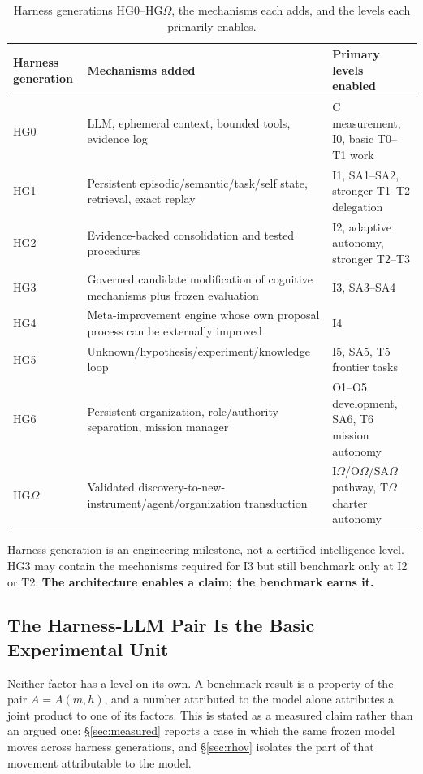 \documentclass[11pt]{article}
\theoremstyle{definition}
\newcommand{\Om}{\ensuremath{\Omega}}
\begin{document}
\begin{table}[H]
\centering\small
\begin{tabularx}{\textwidth}{@{}lYY@{}}
\toprule
Harness generation & Mechanisms added & Primary levels enabled \\
\midrule
HG0 & LLM, ephemeral context, bounded tools, evidence log & C measurement, I0, basic T0--T1 work \\
HG1 & Persistent episodic/semantic/task/self state, retrieval, exact replay & I1, SA1--SA2, stronger T1--T2 delegation \\
HG2 & Evidence-backed consolidation and tested procedures & I2, adaptive autonomy, stronger T2--T3 \\
HG3 & Governed candidate modification of cognitive mechanisms plus frozen evaluation & I3, SA3--SA4 \\
HG4 & Meta-improvement engine whose own proposal process can be externally improved & I4 \\
HG5 & Unknown/hypothesis/experiment/knowledge loop & I5, SA5, T5 frontier tasks \\
HG6 & Persistent organization, role/authority separation, mission manager & O1--O5 development, SA6, T6 mission autonomy \\
HG\Om{} & Validated discovery-to-new-instrument/agent/organization transduction & I\Om{}/O\Om{}/SA\Om{} pathway, T\Om{} charter autonomy \\
\bottomrule
\end{tabularx}
\caption{Harness generations HG0--HG\Om{}, the mechanisms each adds, and the levels each primarily enables.}
\label{tab:hg}
\end{table}

Harness generation is an engineering milestone, not a certified intelligence level. HG3 may contain the mechanisms required for I3 but still benchmark only at I2 or T2. \textbf{The architecture enables a claim; the benchmark earns it.}

\subsection{The Harness-LLM Pair Is the Basic Experimental Unit}\label{sec:pair}

Neither factor has a level on its own. A benchmark result is a property of the pair $A = A(m,h)$, and a number attributed to the model alone attributes a joint product to one of its factors. This is stated as a measured claim rather than an argued one: \S\ref{sec:measured} reports a case in which the same frozen model moves across harness generations, and \S\ref{sec:rhov} isolates the part of that movement attributable to the model.
\end{document}
